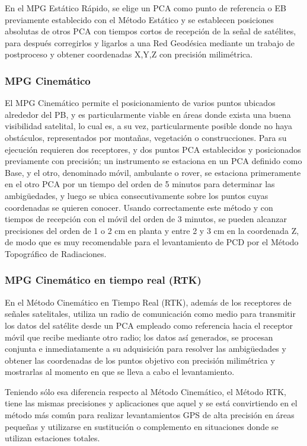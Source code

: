 En el MPG Estático Rápido, se elige un PCA como punto de referencia o EB previamente establecido con el Método Estático y se establecen posiciones absolutas de otros PCA con tiempos cortos de recepción de la señal de satélites, para después corregirlos y ligarlos a una Red Geodésica mediante un trabajo de postproceso y obtener coordenadas X,Y,Z con precisión milimétrica.

\subsubsection{MPG Cinemático}

El MPG Cinemático permite el posicionamiento de varios puntos ubicados alrededor del PB, y es particularmente viable en áreas donde exista una buena visibilidad satelital, lo cual es, a su vez, particularmente posible donde no haya obstáculos, representados por montañas, vegetación o construcciones. Para su ejecución requieren dos receptores, y dos puntos PCA establecidos y posicionados previamente con precisión; un instrumento se estaciona en un PCA definido como Base, y el otro, denominado móvil, ambulante o rover, se estaciona primeramente en el otro PCA por un tiempo del orden de 5 minutos para determinar las ambigüedades, y luego se ubica consecutivamente sobre los puntos cuyas coordenadas se quieren conocer. Usando correctamente este método y con tiempos de recepción con el móvil del orden de 3 minutos, se pueden alcanzar precisiones del orden de 1 o 2 cm en planta y entre 2 y 3 cm en la coordenada Z, de modo que es muy recomendable para el levantamiento de PCD por el Método Topográfico de Radiaciones.

\subsubsection{MPG Cinemático en tiempo real (RTK)}
En el Método Cinemático en Tiempo Real (RTK), además de los receptores de señales satelitales, utiliza un radio de comunicación como medio para transmitir los datos del satélite desde un PCA empleado como referencia hacia el receptor móvil que recibe mediante otro radio; los datos así generados, se procesan conjunta e inmediatamente a su adquisición para resolver las ambigüedades y obtener las coordenadas de los puntos objetivo con precisión milimétrica y mostrarlas al momento en que se lleva a cabo el levantamiento.

Teniendo sólo esa diferencia respecto al Método Cinemático, el Método RTK, tiene las mismas precisiones y aplicaciones que aquel y se está convirtiendo en el método más común para realizar levantamientos GPS de alta precisión en áreas pequeñas y utilizarse en sustitución o complemento en situaciones donde se utilizan estaciones totales.

